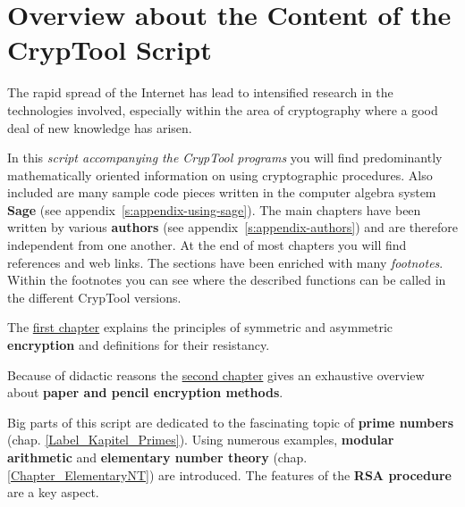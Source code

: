 
\makeatletter \renewcommand{\thepage}{~\csname @roman\endcsname \c@page~} \makeatother
\clearpage{}
\makeatletter \renewcommand{\thepage}{\csname @roman\endcsname \c@page} \makeatother
{}
\chapter*{Overview about the Content of the CrypTool Script}  

\parskip 4pt
The rapid spread of the Internet has lead to intensified research in the
technologies involved, especially within the area of cryptography where a good
deal of new knowledge has arisen.

In this {\em script accompanying the CrypTool programs} 
you will find predominantly mathematically oriented information on using
cryptographic procedures. Also included are many sample code pieces written in the
computer algebra system {\bf Sage} (see appendix~\ref{s:appendix-using-sage}).
The main chapters have been written by various {\bf authors}
(see appendix~\ref{s:appendix-authors}) %
and are therefore independent from one another. At the end of most chapters
you will find references and web links.
The sections have been enriched with many {\em footnotes}. Within the footnotes
you can see where the described functions can be called in the different CrypTool
versions.

The \hyperlink{Kapitel_1}{first chapter} explains the principles of symmetric
and asymmetric {\bf encryption} and definitions for their resistancy.

Because of didactic reasons the \hyperlink{Kapitel_PaperandPencil}
{second chapter} gives an exhaustive overview
about {\bf paper and pencil encryption methods}.

Big parts of this script are dedicated to the fascinating topic of 
{\bf prime numbers} (chap. \ref{Label_Kapitel_Primes}).
Using numerous examples, {\bf modular arithmetic} and 
{\bf elementary number theory} (chap. \ref{Chapter_ElementaryNT})
are introduced. The features of the {\bf RSA procedure} are a key aspect.

